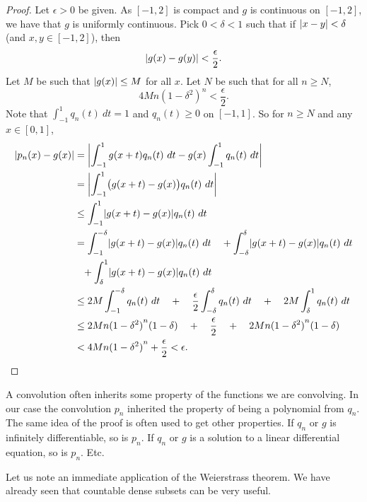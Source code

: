 \begin{proof}
Let $\epsilon > 0$ be given.
As $[-1,2]$ is compact and $g$ is continuous on $[-1,2]$, we have that $g$ is uniformly continuous.
Pick $0 < \delta < 1$ such that if
$\lvert {x-y} \rvert < \delta$ (and $x,y \in [-1,2]$), then
\begin{equation*}
\lvert {g(x)-g(y)} \rvert < \frac{\epsilon}{2} .
\end{equation*}
Let $M$ be such that $\lvert {g(x)} \rvert \leq M$ for all $x$.  Let $N$ be
such that for all $n \geq N$,
\begin{equation*}
4M n{(1-\delta^2)}^n < \frac{\epsilon}{2} .
\end{equation*}
Note that 
$\int_{-1}^1 q_n(t) ~ dt = 1$ and $q_n(t) \geq 0$ on $[-1,1]$.  So for $n
\geq N$ and any $x \in [0,1]$,
\begin{equation*}
\begin{split}
\lvert {p_n(x)-g(x)} \rvert & =
\left\lvert {\int_{-1}^1 g(x+t)q_n(t) ~ dt
-g(x)\int_{-1}^1 q_n(t) ~ dt} \right\rvert \\
& =
\left\lvert {\int_{-1}^1 \bigl(g(x+t)-g(x)\bigr)q_n(t) ~ dt} \right\rvert \\
& \leq
\int_{-1}^1 \lvert {g(x+t)-g(x)} \rvert q_n(t) ~ dt \\
& =
\int_{-1}^{-\delta} \lvert {g(x+t)-g(x)} \rvert q_n(t) ~ dt
\quad +
\int_{-\delta}^{\delta} \lvert {g(x+t)-g(x)} \rvert q_n(t) ~ dt
\\
& \phantom{\leq} +
\int_{\delta}^1 \lvert {g(x+t)-g(x)} \rvert q_n(t) ~ dt \\
& \leq
2M
\int_{-1}^{-\delta} q_n(t) ~ dt
\quad
+
\quad
\frac{\epsilon}{2}
\int_{-\delta}^{\delta} q_n(t) ~ dt
\quad
+
\quad
2M
\int_{\delta}^1 q_n(t) ~ dt \\
& \leq
2M n{(1-\delta^2)}^n(1-\delta)
\quad
+
\quad
\frac{\epsilon}{2}
\quad
+
\quad
2M n{(1-\delta^2)}^n(1-\delta) \\
& <
4M n{(1-\delta^2)}^n
+
\frac{\epsilon}{2}
< \epsilon . \qedhere
\end{split}
\end{equation*}
\end{proof}

A convolution often inherits some property of the functions we are convolving.
In our case the convolution $p_n$ inherited the property of being a
polynomial from $q_n$.  The same idea of the proof is often used 
to get other properties.  If $q_n$ or $g$ is infinitely differentiable, so is $p_n$.
If $q_n$ or $g$ is a solution to a linear differential equation, so is $p_n$.
Etc.

Let us note an immediate application of the Weierstrass theorem.  We have
already seen that countable dense subsets can be very useful.

